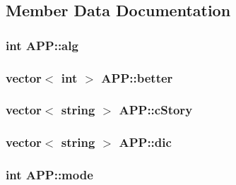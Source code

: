 \subsection{Member Data Documentation}
\hypertarget{class_a_p_p_a09ff32362a370e70a2b0c8dfc2f4b406}{
\subsubsection[{alg}]{\setlength{\rightskip}{0pt plus 5cm}int A\+P\+P\+::alg\hspace{0.3cm}{\ttfamily [protected]}}}\label{class_a_p_p_a09ff32362a370e70a2b0c8dfc2f4b406}
\hypertarget{class_a_p_p_a5ab0c5c949700e522f41ee4a8c35de52}{
\subsubsection[{better}]{\setlength{\rightskip}{0pt plus 5cm}vector$<$ int $>$ A\+P\+P\+::better\hspace{0.3cm}{\ttfamily [protected]}}}\label{class_a_p_p_a5ab0c5c949700e522f41ee4a8c35de52}
\hypertarget{class_a_p_p_a599d2539b3815e510bf1f1be28e4047f}{
\subsubsection[{c\+Story}]{\setlength{\rightskip}{0pt plus 5cm}vector$<$ string $>$ A\+P\+P\+::c\+Story\hspace{0.3cm}{\ttfamily [protected]}}}\label{class_a_p_p_a599d2539b3815e510bf1f1be28e4047f}
\hypertarget{class_a_p_p_ad434309fd56f06dace1a73e0a8b069d9}{
\subsubsection[{dic}]{\setlength{\rightskip}{0pt plus 5cm}vector$<$ string $>$ A\+P\+P\+::dic\hspace{0.3cm}{\ttfamily [protected]}}}\label{class_a_p_p_ad434309fd56f06dace1a73e0a8b069d9}
\hypertarget{class_a_p_p_a799513151a59f01ffcbbf5ba85a2d1c6}{
\subsubsection[{mode}]{\setlength{\rightskip}{0pt plus 5cm}int A\+P\+P\+::mode\hspace{0.3cm}{\ttfamily [protected]}}}\label{class_a_p_p_a799513151a59f01ffcbbf5ba85a2d1c6}
